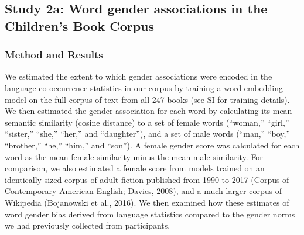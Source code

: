 \documentclass[
  english,
  ,man,floatsintext]{apa6}
\begin{document}
\hypertarget{study-2a-word-gender-associations-in-the-childrens-book-corpus}{%
\subsection{Study 2a: Word gender associations in the Children's Book Corpus}\label{study-2a-word-gender-associations-in-the-childrens-book-corpus}}

\hypertarget{method-and-results-1}{%
\subsubsection{Method and Results}\label{method-and-results-1}}

We estimated the extent to which gender associations were encoded in the language co-occurrence statistics in our corpus by training a word embedding model on the full corpus of text from all 247 books (see SI for training details). We then estimated the gender association for each word by calculating its mean semantic similarity (cosine distance) to a set of female words (\enquote{woman,} \enquote{girl,} \enquote{sister,} \enquote{she,} \enquote{her,} and \enquote{daughter}), and a set of male words (\enquote{man,} \enquote{boy,} \enquote{brother,} \enquote{he,} \enquote{him,} and \enquote{son}). A female gender score was calculated for each word as the mean female similarity minus the mean male similarity. For comparison, we also estimated a female score from models trained on an identically sized corpus of adult fiction published from 1990 to 2017 (Corpus of Contemporary American English; Davies, 2008), and a much larger corpus of Wikipedia (Bojanowski et al., 2016). We then examined how these estimates of word gender bias derived from language statistics compared to the gender norms we had previously collected from participants.
\end{document}
